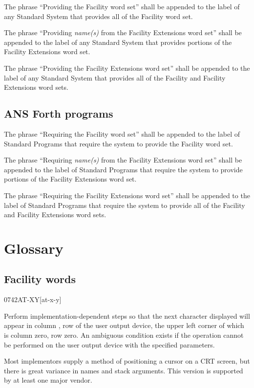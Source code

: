 The phrase ``Providing the Facility word set'' shall be appended to
the label of any Standard System that provides all of the Facility
word set.

The phrase ``Providing \emph{name(s)} from the Facility Extensions
word set'' shall be appended to the label of any Standard System
that provides portions of the Facility Extensions word set.

The phrase ``Providing the Facility Extensions word set'' shall be
appended to the label of any Standard System that provides all of
the Facility and Facility Extensions word sets.

\subsection{ANS Forth programs} %

The phrase ``Requiring the Facility word set'' shall be appended to
the label of Standard Programs that require the system to provide
the Facility word set.

The phrase ``Requiring \emph{name(s)} from the Facility Extensions
word set'' shall be appended to the label of Standard Programs that
require the system to provide portions of the Facility Extensions
word set.

The phrase ``Requiring the Facility Extensions word set'' shall be
appended to the label of Standard Programs that require the system
to provide all of the Facility and Facility Extensions word sets.

\section{Glossary} %

\subsection{Facility words} %

\begin{worddef}{0742}{AT-XY}[at-x-y]
\item {}

	Perform implementation-dependent steps so that the next
	character displayed will appear in column , row
	 of the user output device, the upper left corner
	of which is column zero, row zero. An ambiguous condition exists
	if the operation cannot be performed on the user output device
	with the specified parameters.

	\begin{defer}
	\rationale %
		Most implementors supply a method of positioning a cursor on
		a CRT screen, but there is great variance in names and stack
		arguments. This version is supported by at least one major
		vendor.
	\end{defer}
\end{worddef}


